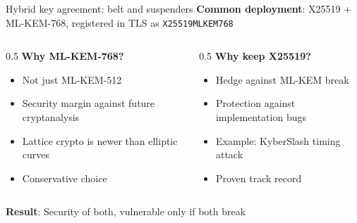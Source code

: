 \ifdefined\PRESENTATION\else\PassOptionsToClass{handout}{beamer}\fi\documentclass[aspectratio=169, lualatex]{beamer}
\begin{document}
\begin{frame}{Hybrid key agreement: belt and suspenders}
	\textbf{Common deployment}: X25519 + ML-KEM-768, registered in TLS as \texttt{X25519MLKEM768}
	\begin{columns}[c]
		\begin{column}{0.5\textwidth}
			\textbf{Why ML-KEM-768?}
			\begin{itemize}
				\item Not just ML-KEM-512
				\item Security margin against future cryptanalysis
				\item Lattice crypto is newer than elliptic curves
				\item Conservative choice
			\end{itemize}
		\end{column}
		\begin{column}{0.5\textwidth}
			\textbf{Why keep X25519?}
			\begin{itemize}
				\item Hedge against ML-KEM break
				\item Protection against implementation bugs
				\item Example: KyberSlash timing attack
				\item Proven track record
			\end{itemize}
		\end{column}
	\end{columns}
	\vspace{5mm}
	\begin{center}
		\textbf{Result}: Security of both, vulnerable only if both break
	\end{center}
\end{frame}
\end{document}
